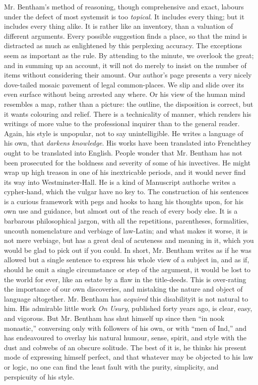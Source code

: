 Mr. Bentham's method of reasoning, though comprehensive and exact,
labours under the defect of most systems\textemdash it is too
\emph{topical}. It includes every thing; but it includes every
thing alike. It is rather like an inventory, than a valuation of
different arguments. Every possible suggestion finds a place, so
that the mind is distracted as much as enlightened by this
perplexing accuracy. The exceptions seem as important as the
rule. By attending to the minute, we overlook the great; and in
summing up an account, it will not do merely to insist on the
number of items without considering their amount. Our author's
page presents a very nicely dove-tailed mosaic pavement of legal
common-places. We slip and slide over its even surface without
being arrested any where. Or his view of the human mind resembles
a map, rather than a picture: the outline, the disposition is
correct, but it wants colouring and relief. There is a
technicality of manner, which renders his writings of more value
to the professional inquirer than to the general reader. Again,
his style is unpopular, not to say unintelligible. He writes a
language of his own, that \emph{darkens knowledge}. His works have
been translated into French\textemdash they ought to be translated
into English. People wonder that Mr. Bentham has not been
prosecuted for the boldness and severity of some of his
invectives. He might wrap up high treason in one of his
inextricable periods, and it would never find its way into
Westminster-Hall. He is a kind of Manuscript author\textemdash he
writes a cypher-hand, which the vulgar have no key to. The
construction of his sentences is a curious framework with pegs and
hooks to hang his thoughts upon, for his own use and guidance, but
almost out of the reach of every body else. It is a barbarous
philosophical jargon, with all the repetitions, parentheses,
formalities, uncouth nomenclature and verbiage of law-Latin; and
what makes it worse, it is not mere verbiage, but has a great deal
of acuteness and meaning in it, which you would be glad to pick
out if you could. In short, Mr. Bentham writes as if he was
allowed but a single sentence to express his whole view of a
subject in, and as if, should he omit a single circumstance or
step of the argument, it would be lost to the world for ever, like
an estate by a flaw in the title-deeds. This is over-rating the
importance of our own discoveries, and mistaking the nature and
object of language altogether. Mr. Bentham has \emph{acquired}
this disability\textemdash it is not natural to him. His admirable
little work \emph{On Usury}, published forty years ago, is clear,
easy, and vigorous. But Mr.  Bentham has shut himself up since
then ``in nook monastic,'' conversing only with followers of his
own, or with ``men of Ind,'' and has endeavoured to overlay his
natural humour, sense, spirit, and style with the dust and cobwebs
of an obscure solitude. The best of it is, he thinks his present
mode of expressing himself perfect, and that whatever may be
objected to his law or logic, no one can find the least fault with
the purity, simplicity, and perspicuity of his style.

